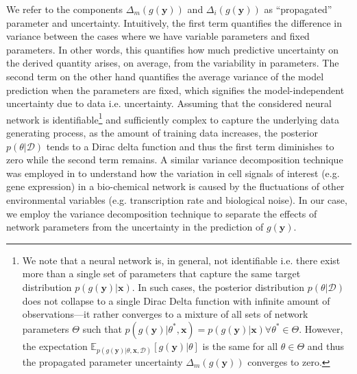 We refer to the components $ \Delta_{m}(g(\mathbf{y})) $ and $ \Delta_{i}(g(\mathbf{y})) $ as ``propagated'' parameter and  uncertainty.  Intuitively, the first term quantifies the difference in variance between the cases where we have variable parameters and fixed parameters. In other words, this quantifies how much predictive uncertainty on the derived quantity arises, on average, from the variability in parameters. The second term on the other hand quantifies the average variance of the model prediction when the parameters are fixed, which signifies the model-independent uncertainty due to data i.e.  uncertainty.  Assuming that the considered neural network is identifiable\footnote{We note that a neural network is, in general, not identifiable i.e. there exist more than a single set of parameters that capture the same target distribution $p(g(\mathbf{y})|\mathbf{x})$. In such cases, the posterior distribution $p(\theta|\mathcal{D})$ does not collapse to a single Dirac Delta function with infinite amount of observations---it rather converges to a mixture of all sets of network parameters $\Theta$  such that $p(g(\mathbf{y})|\theta^{*},\mathbf{x}) = p(g(\mathbf{y})|\mathbf{x}) \forall \theta^{*} \in \Theta $. However, the expectation $\mathbb{E}_{p(g(\mathbf{y})|\theta,\mathbf{x},\mathcal{D})}[g(\mathbf{y})|\theta]$ is the same for all $\theta \in \Theta$ and thus the propagated parameter uncertainty $ \Delta_{m}(g(\mathbf{y}))$ converges to zero. } and sufficiently complex to capture the underlying data generating process, as the amount of training data increases, the posterior $p(\theta|\mathcal{D})$ tends to a Dirac delta function and thus the first term diminishes to zero while the second term remains. A similar variance decomposition technique was employed in \cite{bowsher2012identifying} to understand how the variation in cell signals of interest (e.g. gene expression) in a bio-chemical network is caused by the fluctuations of other environmental variables (e.g. transcription rate and biological noise). In our case, we employ the variance decomposition technique to separate the effects of network parameters from the  uncertainty in the prediction of $g(\mathbf{y})$.  


